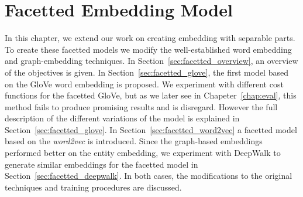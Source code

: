 
\chapter{Facetted Embedding Model}\label{chap:faceted}
In this chapter, we extend our work on creating embedding with separable parts. To create these facetted models we modify the well-established word embedding and graph-embedding techniques. In Section~\ref{sec:facetted_overview}, an overview of the objectives is given. In Section~\ref{sec:facetted_glove}, the first model based on the GloVe word embedding is proposed. We experiment with different cost functions for the facetted GloVe, but as we later see in Chapeter~\ref{chap:eval}, this method fails to produce promising results and is disregard. However the full description of the different variations of the model is explained in Section~\ref{sec:facetted_glove}. In Section~\ref{sec:facetted_word2vec} a facetted model based on the \emph{word2vec} is introduced. Since the graph-based embeddings performed better on the entity embedding, we experiment with DeepWalk to generate similar embeddings for the facetted model in Section~\ref{sec:facetted_deepwalk}. In both cases, the modifications to the original techniques and training procedures are discussed. 


